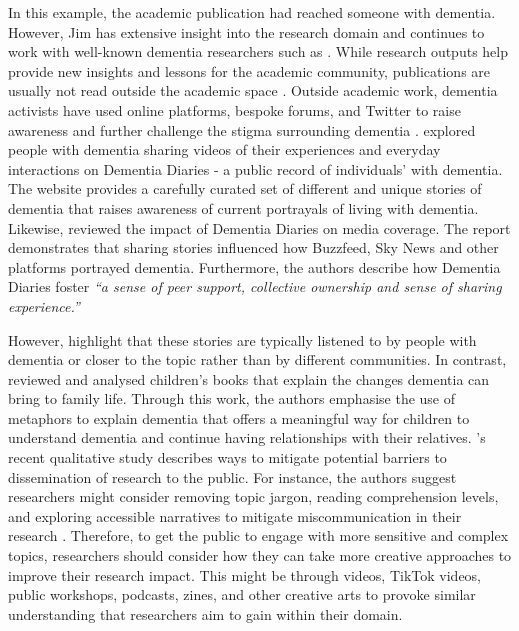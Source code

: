 In this example, the academic publication had reached someone with dementia. However, Jim has extensive insight into the research domain and continues to work with well-known dementia researchers such as \citeauthor{bartlett2010broadening}. While research outputs help provide new insights and lessons for the academic community, publications are usually not read outside the academic space \citep{hartley2012new}. Outside academic work, dementia activists have used online platforms, bespoke forums, and Twitter to raise awareness and further challenge the stigma surrounding dementia \citep{talbot_how_2020}. \cite{lazar_safe_2019} explored people with dementia sharing videos of their experiences and everyday interactions on Dementia Diaries - a public record of individuals' with dementia. The website provides a carefully curated set of different and unique stories of dementia that raises awareness of current portrayals of living with dementia. Likewise, \cite{woodall2016independent} reviewed the impact of Dementia Diaries on media coverage. The report demonstrates that sharing stories influenced how Buzzfeed, Sky News and other platforms portrayed dementia. Furthermore, the authors describe how Dementia Diaries foster \textit{``a sense of peer support, collective ownership and sense of sharing experience.''}

However, \cite{woodall2016independent} highlight that these stories are typically listened to by people with dementia or closer to the topic rather than by different communities. In contrast, \cite{caldwell2021depicting} reviewed and analysed children's books that explain the changes dementia can bring to family life. Through this work, the authors emphasise the use of metaphors to explain dementia that offers a meaningful way for children to understand dementia and continue having relationships with their relatives. \citeauthor{smith2020disseminating}'s recent qualitative study describes ways to mitigate potential barriers to dissemination of research to the public. For instance, the authors suggest researchers might consider removing topic jargon, reading comprehension levels, and exploring accessible narratives to mitigate miscommunication in their research \citep{smith2020disseminating}. Therefore, to get the public to engage with more sensitive and complex topics, researchers should consider how they can take more creative approaches to improve their research impact. This might be through videos, TikTok videos, public workshops, podcasts, zines, and other creative arts to provoke similar understanding that researchers aim to gain within their domain.

